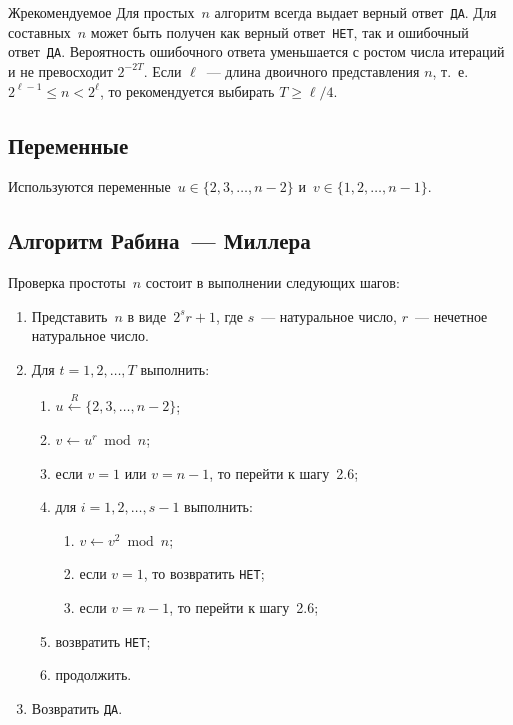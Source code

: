 \begin{appendix}{Ж}{рекомендуемое}
Для простых~$n$ алгоритм всегда выдает верный ответ~\texttt{ДА}. 
%
Для составных~$n$ может быть получен как верный ответ~\texttt{НЕТ},
так и ошибочный ответ~\texttt{ДА}. 
Вероятность ошибочного ответа уменьшается с ростом числа итераций
и не превосходит $2^{-2T}$.
Если $\ell$~--- длина двоичного представления $n$, т.~е. $2^{\ell-1}\leq n<2^\ell$,
то рекомендуется выбирать $T\geq\ell/4$.

\subsection{Переменные}\label{NT.PrimeQ.Vars}

Используются переменные~$u\in\{2,3,\ldots,n-2\}$
и~$v\in\{1,2,\ldots,n-1\}$.

\subsection{Алгоритм Рабина~--- Миллера}\label{NT.PrimeQ.Alg}

Проверка простоты~$n$ состоит в выполнении следующих шагов:
\begin{enumerate}
\item
Представить~$n$ в виде~$2^s r + 1$,
где $s$~--- натуральное число, $r$~--- нечетное натуральное число.

\item
Для $t=1,2,\ldots,T$ выполнить:
\begin{enumerate}
\item
$u\stackrel{R}{\leftarrow}\{2,3,\ldots,n-2\}$;
\item
$v\leftarrow u^r \bmod n$;
\item
если $v=1$ или $v=n-1$, то перейти к шагу~2.6;
\item
для $i=1,2,\ldots,s-1$ выполнить:
\begin{enumerate}
\item
$v\leftarrow v^2\bmod n$;
\item
если $v=1$, то возвратить \texttt{НЕТ};
\item
если $v=n-1$, то перейти к шагу~2.6;
\end{enumerate}
\item
возвратить \texttt{НЕТ};
\item
продолжить.
\end{enumerate}
\item
Возвратить \texttt{ДА}.
\end{enumerate}

\label{NT.Legendre}


\end{appendix}
